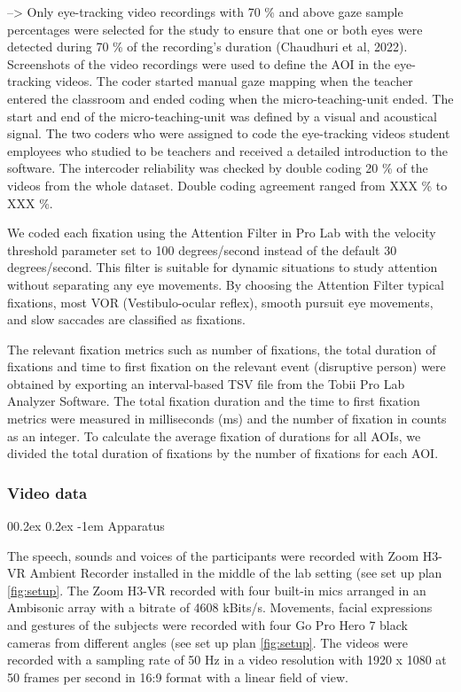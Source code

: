 \documentclass[
  man]{apa6}
\makeatletter
\let\oldparagraph\paragraph
\renewcommand{\paragraph}[1]{\oldparagraph{#1}\mbox{}}
\renewcommand{\paragraph}{\@startsection{paragraph}{4}{\parindent}%
  {0\baselineskip \@plus 0.2ex \@minus 0.2ex}%
  {-1em}%
  {\normalfont\normalsize\bfseries\itshape\typesectitle}}
\makeatother
\begin{document}
--\textgreater{} Only eye-tracking video recordings with 70 \% and above gaze sample percentages were selected for the study to ensure that one or both eyes were detected during 70 \% of the recording's duration (Chaudhuri et al, 2022). Screenshots of the video recordings were used to define the AOI in the eye-tracking videos. The coder started manual gaze mapping when the teacher entered the classroom and ended coding when the micro-teaching-unit ended. The start and end of the micro-teaching-unit was defined by a visual and acoustical signal. The two coders who were assigned to code the eye-tracking videos student employees who studied to be teachers and received a detailed introduction to the software. The intercoder reliability was checked by double coding 20 \% of the videos from the whole dataset. Double coding agreement ranged from XXX \% to XXX \%.

We coded each fixation using the Attention Filter in Pro Lab with the velocity threshold parameter set to 100 degrees/second instead of the default 30 degrees/second. This filter is suitable for dynamic situations to study attention without separating any eye movements. By choosing the Attention Filter typical fixations, most VOR (Vestibulo-ocular reflex), smooth pursuit eye movements, and slow saccades are classified as fixations.

The relevant fixation metrics such as number of fixations, the total duration of fixations and time to first fixation on the relevant event (disruptive person) were obtained by exporting an interval-based TSV file from the Tobii Pro Lab Analyzer Software. The total fixation duration and the time to first fixation metrics were measured in milliseconds (ms) and the number of fixation in counts as an integer. To calculate the average fixation of durations for all AOIs, we divided the total duration of fixations by the number of fixations for each AOI.

\subsubsection{Video data}\label{video-data}

\paragraph{Apparatus}\label{apparatus-1}

The speech, sounds and voices of the participants were recorded with Zoom H3-VR Ambient Recorder installed in the middle of the lab setting (see set up plan \ref{fig:setup}. The Zoom H3-VR recorded with four built-in mics arranged in an Ambisonic array with a bitrate of 4608 kBits/s. Movements, facial expressions and gestures of the subjects were recorded with four Go Pro Hero 7 black cameras from different angles (see set up plan \ref{fig:setup}. The videos were recorded with a sampling rate of 50 Hz in a video resolution with 1920 x 1080 at 50 frames per second in 16:9 format with a linear field of view.
\end{document}
